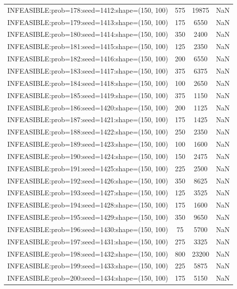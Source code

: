 \begin{longtable}{lccc}
INFEASIBLE:prob=178:seed=1412:shape=(150, 100) &      575 & 19875 &    NaN \\
INFEASIBLE:prob=179:seed=1413:shape=(150, 100) &      175 &  6550 &    NaN \\
INFEASIBLE:prob=180:seed=1414:shape=(150, 100) &      350 &  2400 &    NaN \\
INFEASIBLE:prob=181:seed=1415:shape=(150, 100) &      125 &  2350 &    NaN \\
INFEASIBLE:prob=182:seed=1416:shape=(150, 100) &      200 &  6550 &    NaN \\
INFEASIBLE:prob=183:seed=1417:shape=(150, 100) &      375 &  6375 &    NaN \\
INFEASIBLE:prob=184:seed=1418:shape=(150, 100) &      100 &  2650 &    NaN \\
INFEASIBLE:prob=185:seed=1419:shape=(150, 100) &      375 &  1150 &    NaN \\
INFEASIBLE:prob=186:seed=1420:shape=(150, 100) &      200 &  1125 &    NaN \\
INFEASIBLE:prob=187:seed=1421:shape=(150, 100) &      175 &  1425 &    NaN \\
INFEASIBLE:prob=188:seed=1422:shape=(150, 100) &      250 &  2350 &    NaN \\
INFEASIBLE:prob=189:seed=1423:shape=(150, 100) &      100 &  1600 &    NaN \\
INFEASIBLE:prob=190:seed=1424:shape=(150, 100) &      150 &  2475 &    NaN \\
INFEASIBLE:prob=191:seed=1425:shape=(150, 100) &      225 &  2500 &    NaN \\
INFEASIBLE:prob=192:seed=1426:shape=(150, 100) &      350 &  8625 &    NaN \\
INFEASIBLE:prob=193:seed=1427:shape=(150, 100) &      125 &  3525 &    NaN \\
INFEASIBLE:prob=194:seed=1428:shape=(150, 100) &      175 &  1600 &    NaN \\
INFEASIBLE:prob=195:seed=1429:shape=(150, 100) &      350 &  9650 &    NaN \\
INFEASIBLE:prob=196:seed=1430:shape=(150, 100) &       75 &  5700 &    NaN \\
INFEASIBLE:prob=197:seed=1431:shape=(150, 100) &      275 &  3325 &    NaN \\
INFEASIBLE:prob=198:seed=1432:shape=(150, 100) &      800 & 23200 &    NaN \\
INFEASIBLE:prob=199:seed=1433:shape=(150, 100) &      225 &  5875 &    NaN \\
INFEASIBLE:prob=200:seed=1434:shape=(150, 100) &      175 &  5150 &    NaN \\

\end{longtable}
